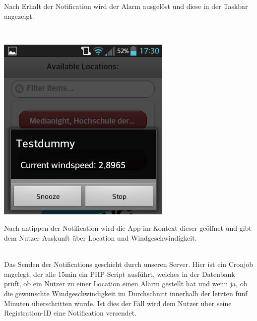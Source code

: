\documentclass{report}
\begin{document}
\begin{minipage}{0.5\textwidth}
Nach Erhalt der Notification wird der Alarm ausgelöst und diese in der Taskbar angezeigt.
\end{minipage}\\[1cm]
\begin{minipage}{0.5\textwidth}
    \centerline{
        \includegraphics[width=\textwidth]{Bilder/notif_context.png}
    }
\end{minipage}
\begin{minipage}{0.5\textwidth}
Nach antippen der Notification wird die App im Kontext dieser geöffnet und gibt dem Nutzer Auskunft über Location und Windgeschwindigkeit.
\end{minipage}\\[1cm]
Das Senden der Notifications geschieht durch unseren Server.
Hier ist ein Cronjob angelegt, der alle 15min ein PHP-Script ausführt, welches in der Datenbank prüft, ob ein Nutzer zu einer Location einen Alarm gestellt hat und wenn ja, ob die gewünschte Windgeschwindigkeit im Durchschnitt innerhalb der letzten fünf Minuten überschritten wurde.
Ist dies der Fall wird dem Nutzer über seine Registration-ID eine Notification versendet.
\end{document}
